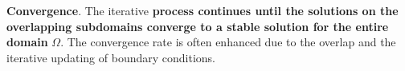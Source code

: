 \begin{examplebox}
    \highspace
    \textbf{Convergence}. The iterative \textbf{process continues until the solutions on the overlapping subdomains converge to a stable solution for the entire domain} $\Omega$. The convergence rate is often enhanced due to the overlap and the iterative updating of boundary conditions.
\end{examplebox}